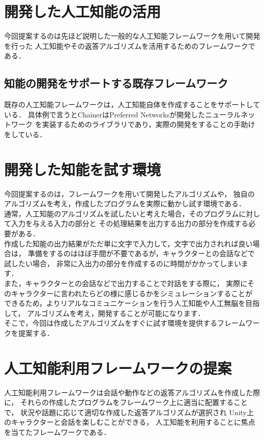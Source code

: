 \section{開発した人工知能の活用}
今回提案するのは先ほど説明した一般的な人工知能フレームワークを用いて開発を行った
人工知能やその返答アルゴリズムを活用するためのフレームワークである．\\
\subsection{知能の開発をサポートする既存フレームワーク}
既存の人工知能フレームワークは，人工知能自体を作成することをサポートしている．
具体例で言うとChainerはPreferred Networksが開発したニューラルネットワーク
を実装するためのライブラリであり，実際の開発をすることの手助けをしている．
\section{開発した知能を試す環境}
今回提案するのは，フレームワークを用いて開発したアルゴリズムや，
独自のアルゴリズムを考え，作成したプログラムを実際に動かし試す環境である．
\\
通常，人工知能のアルゴリズムを試したいと考えた場合，そのプログラムに対して入力を与える入力の部分と
その処理結果を出力する出力の部分を作成する必要がある．
\\
作成した知能の出力結果がただ単に文字で入力して，文字で出力されれば良い場合は，
準備をするのはほぼ手間が不要であるが，キャラクターとの会話などで試したい場合，
非常に入出力の部分を作成するのに時間がかかってしまいます．
\\
また，キャラクターとの会話などで出力することで対話をする際に，
実際にそのキャラクターに言われたらどの様に感じるかをシミュレーションすることが
できるため，よりリアルなコミュニケーションを行う人工知能や人工無脳を目指して，
アルゴリズムを考え，開発することが可能になります．
\\
そこで，今回は作成したアルゴリズムをすぐに試す環境を提供するフレームワークを提案する．
\section{人工知能利用フレームワークの提案}
人工知能利用フレームワークは会話や動作などの返答アルゴリズムを作成した際に，
それらの作成したプログラムをフレームワーク上に適当に配置することで，
状況や話題に応じて適切な作成した返答アルゴリズムが選択され
Unity上のキャラクターと会話を楽しむことができる，
人工知能を利用することに焦点を当てたフレームワークである．
